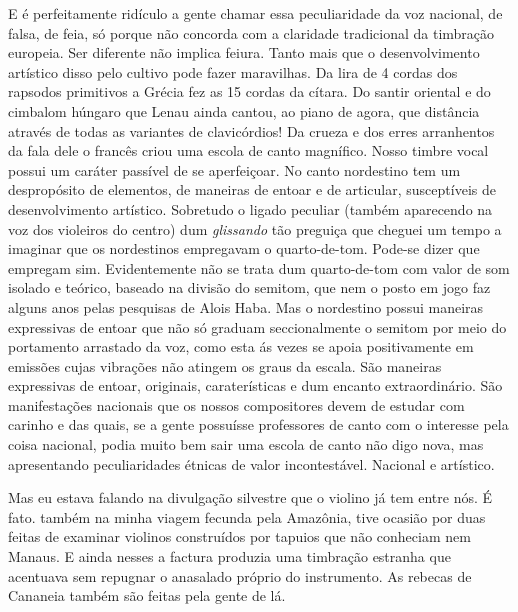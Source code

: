 E é perfeitamente ridículo a gente chamar essa peculiaridade da voz
nacional, de falsa, de feia, só porque não concorda com a claridade
tradicional da timbração europeia. Ser diferente não implica feiura.
Tanto mais que o desenvolvimento artístico disso pelo cultivo pode fazer
maravilhas. Da lira de 4 cordas dos rapsodos primitivos a Grécia fez as
15 cordas da cítara. Do santir oriental e do cimbalom húngaro que Lenau
ainda cantou, ao piano de agora, que distância através de todas as
variantes de clavicórdios! Da crueza e dos erres arranhentos da fala
dele o francês criou uma escola de canto magnífico. Nosso timbre vocal
possui um caráter passível de se aperfeiçoar. No canto nordestino tem um
despropósito de elementos, de maneiras de entoar e de articular,
susceptíveis de desenvolvimento artístico. Sobretudo o ligado peculiar
(também aparecendo na voz dos violeiros do centro) dum \textit{glissando} tão
preguiça que cheguei um tempo a imaginar que os nordestinos empregavam o
quarto-de-tom. Pode-se dizer que empregam sim. Evidentemente não se
trata dum quarto-de-tom com valor de som isolado e teórico, baseado na
divisão do semitom, que nem o posto em jogo faz alguns anos pelas
pesquisas de Alois Haba. Mas o nordestino possui maneiras expressivas de
entoar que não só graduam seccionalmente o semitom por meio do
portamento arrastado da voz, como esta ás vezes se apoia positivamente
em emissões cujas vibrações não atingem os graus da escala. São maneiras
expressivas de entoar, originais, caraterísticas e dum encanto
extraordinário. São manifestações nacionais que os nossos compositores
devem de estudar com carinho e das quais, se a gente possuísse
professores de canto com o interesse pela coisa nacional, podia muito
bem sair uma escola de canto não digo nova, mas apresentando
peculiaridades étnicas de valor incontestável. Nacional e artístico.

Mas eu estava falando na divulgação silvestre que o violino já tem entre
nós. É fato. também na minha viagem fecunda pela Amazônia, tive ocasião
por duas feitas de examinar violinos construídos por tapuios que não
conheciam nem Manaus. E ainda nesses a factura produzia uma timbração
estranha que acentuava sem repugnar o anasalado próprio do instrumento.
As rebecas de Cananeia também são feitas pela gente de lá.

